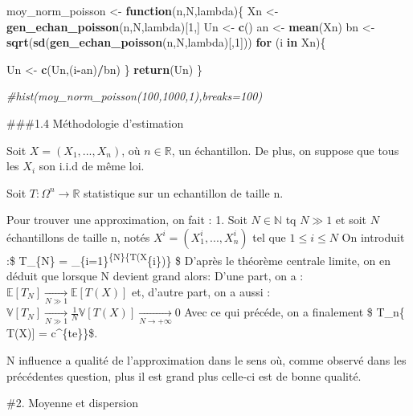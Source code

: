 \documentclass[]{article}
\newenvironment{Shaded}{\begin{snugshade}}{\end{snugshade}}
\newcommand{\CommentTok}[1]{\textcolor[rgb]{0.56,0.35,0.01}{\textit{#1}}}
\newcommand{\ControlFlowTok}[1]{\textcolor[rgb]{0.13,0.29,0.53}{\textbf{#1}}}
\newcommand{\DecValTok}[1]{\textcolor[rgb]{0.00,0.00,0.81}{#1}}
\newcommand{\KeywordTok}[1]{\textcolor[rgb]{0.13,0.29,0.53}{\textbf{#1}}}
\newcommand{\NormalTok}[1]{#1}
\newcommand{\OperatorTok}[1]{\textcolor[rgb]{0.81,0.36,0.00}{\textbf{#1}}}
\newcommand{\StringTok}[1]{\textcolor[rgb]{0.31,0.60,0.02}{#1}}
\begin{document}
\begin{Shaded}
\begin{Highlighting}[]
\NormalTok{moy_norm_poisson <-}\StringTok{ }\ControlFlowTok{function}\NormalTok{(n,N,lambda)\{}
\NormalTok{  Xn <-}\StringTok{ }\KeywordTok{gen_echan_poisson}\NormalTok{(n,N,lambda)[}\DecValTok{1}\NormalTok{,]}
\NormalTok{  Un <-}\StringTok{ }\KeywordTok{c}\NormalTok{()}
\NormalTok{  an <-}\StringTok{ }\KeywordTok{mean}\NormalTok{(Xn)}
\NormalTok{  bn <-}\StringTok{ }\KeywordTok{sqrt}\NormalTok{(}\KeywordTok{sd}\NormalTok{(}\KeywordTok{gen_echan_poisson}\NormalTok{(n,N,lambda)[,}\DecValTok{1}\NormalTok{]))}
  \ControlFlowTok{for}\NormalTok{ (i }\ControlFlowTok{in}\NormalTok{ Xn)\{}
    
\NormalTok{    Un <-}\StringTok{ }\KeywordTok{c}\NormalTok{(Un,(i}\OperatorTok{-}\NormalTok{an)}\OperatorTok{/}\NormalTok{bn)}
\NormalTok{  \}}
  \KeywordTok{return}\NormalTok{(Un)}
\NormalTok{\}}

\CommentTok{#hist(moy_norm_poisson(100,1000,1),breaks=100)}
\end{Highlighting}
\end{Shaded}

\#\#\#1.4 Méthodologie d'estimation

Soit \(X=(X_1, ..., X_n)\), où \(n \in \mathbb{R}\), un échantillon. De
plus, on suppose que tous les \(X_{i}\) son i.i.d de même loi.

Soit \(T : \Omega^n \rightarrow \mathbb{R}\) statistique sur un
echantillon de taille n.

Pour trouver une approximation, on fait : 1. Soit \(N \in \mathbb{N}\)
tq \(N \gg 1\) et soit \(N\) échantillons de taille n, notés
\(X^i = (X^i_1, ..., X^i_n)\) tel que \(1 \leq i \leq N\) On introduit
:\$ T\_\{N\} =
\sum\limits\_\{i=1\}\textsuperscript{\{N\}\{T(X}\{i\})\} \$
D'après le théorème centrale limite, on en déduit que lorsque N devient
grand alors: D'une part, on a :
\(\mathbb{E}[ T_N] \xrightarrow[N \gg 1]{} \mathbb{E}[T(X)]\) et,
d'autre part, on a aussi :
\(\mathbb{V}[ T_N] \xrightarrow[N \gg 1]{} \frac{1}{N}\mathbb{V}[T(X)] \xrightarrow[N \rightarrow +\infty]{} 0\)
Avec ce qui précéde, on a finalement \$
T\_n\{
\mathbb{E}{[}T(X){]} = c\^{}\{te\}\}\$.

N influence a qualité de l'approximation dans le sens où, comme observé
dans les précédentes question, plus il est grand plus celle-ci est de
bonne qualité.

\#2. Moyenne et dispersion
\end{document}
